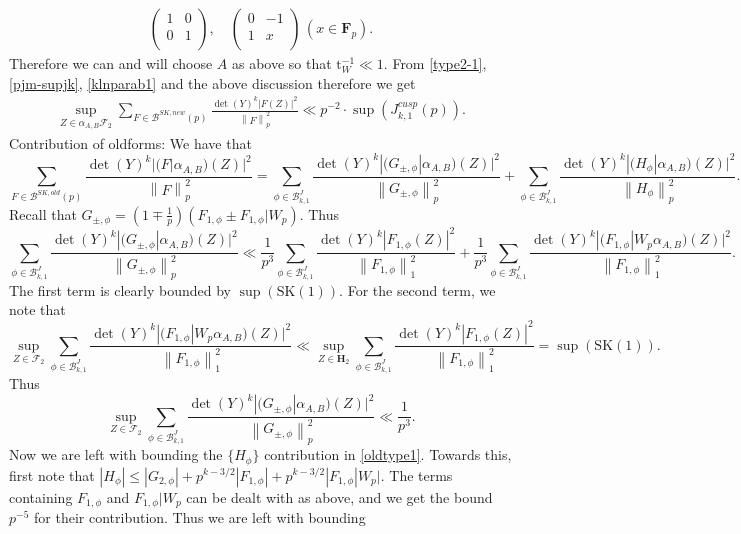 \documentclass[11pt]{amsart}
\makeatletter
\numberwithin{equation}{section}
\renewcommand\subsubsection{\@secnumfont}{\bfseries}%
\renewcommand\subsubsection{\@startsection{subsubsection}{3}
  \z@{.5\linespacing\@plus.7\linespacing}{-.5em}%
  {\normalfont\bfseries}}
\theoremstyle{plain}
\theoremstyle{definition}
\newcommand{\mf}{\mathbf}
\newcommand{\mc}{\mathcal}
\newcommand{\mrm}{\mathrm}
\newcommand*{\norm}[1]{\left\lVert#1\right\rVert}
\newcommand{\q}{\quad}
\newcommand{\pmat}[4]{\begin{pmatrix} #1 & #2 \\ #3 & #4 \\ \end{pmatrix} }
\newcommand{\pfp}{\mf F_p}
\newcommand{\jkp}{J_{k,1}^{cusp}(p)}
\newcommand{\tw}{{\mrm t}_W}
\makeatother
\begin{document}
\begin{align}
    \pmat{1}{0}{0}{1}, \q \pmat{0}{-1}{1}{x} \, (x \in \pfp).
\end{align}
Therefore we can and will choose $A$ as above so that $\tw^{-1} \ll 1$. From \eqref{type2-1}, \eqref{pjm-supjk}, \eqref{klnparab1} and the above discussion therefore we get
\begin{align}
    \sup_{ Z \in {\alpha_{A,B} \mc F_2} } \sum_{F \in \mc B^{SK,new}(p)} \frac{\det(Y)^{k} |F(Z)|^2}{\norm{F}^2_p} \ll p^{-2} \cdot  \sup(\jkp).
\end{align}
\subsubsection{Contribution of oldforms:}\label{old-cont-1} We have that
\begin{equation}\label{oldtype1}
    \sum_{F\in \mc B^{SK, old}(p)}\frac{\det(Y)^k|(F|\alpha_{A,B})(Z)|^2}{\norm{F}^2_p}= \sum_{\phi\in \mc B_{k,1}^J}\frac{\det(Y)^k |(G_{\pm, \phi}|\alpha_{A,B})(Z)|^2}{\norm{G_{\pm, \phi}}^2_p}+\sum_{\phi\in \mc B_{k,1}^J}\frac{\det(Y)^k |(H_{\phi}|\alpha_{A,B})(Z)|^2}{\norm{H_{\phi}}^2_p}.
\end{equation}
Recall that $G_{\pm, \phi}= (1\mp \frac{1}{p})(F_{1,\phi} \pm F_{1,\phi}|W_p)$. Thus
\begin{equation}
    \sum_{\phi\in \mc B_{k,1}^J}\frac{\det(Y)^k |(G_{\pm, \phi}|\alpha_{A,B})(Z)|^2}{\norm{G_{\pm, \phi}}^2_p}\ll \frac{1}{p^3}\sum_{\phi\in \mc B_{k,1}^J} \frac{\det(Y)^k|F_{1,\phi}(Z)|^2}{\norm{F_{1,\phi}}^2_1}+ \frac{1}{p^3}\sum_{\phi\in \mc B_{k,1}^J} \frac{\det(Y)^k|(F_{1,\phi}|W_p\alpha_{A,B})(Z)|^2}{\norm{F_{1,\phi}}^2_1}.
\end{equation}
The first term is clearly bounded by $\sup(\mrm{SK}(1))$. For the second term, we note that
\begin{equation}
    \sup_{Z\in\mc F_2} \sum_{\phi\in \mc B_{k,1}^J} \frac{\det(Y)^k|(F_{1,\phi}|W_p\alpha_{A,B})(Z)|^2}{\norm{F_{1,\phi}}^2_1}\ll \sup_{Z\in \mf H_2} \sum_{\phi\in \mc B_{k,1}^J} \frac{\det(Y)^k|F_{1,\phi}(Z)|^2}{\norm{F_{1,\phi}}^2_1}= \sup(\mrm{SK}(1)).
\end{equation}
Thus 
\begin{equation} \label{g+-bd}
    \sup_{Z\in\mc F_2}\sum_{\phi\in \mc B_{k,1}^J}\frac{\det(Y)^k |(G_{\pm, \phi}|\alpha_{A,B})(Z)|^2}{\norm{G_{\pm, \phi}}^2_p}\ll \frac{1}{p^3}.
\end{equation}
Now we are left with bounding the $\{H_\phi\}$ contribution in \eqref{oldtype1}. Towards this, first note that $|H_\phi|\le |G_{2,\phi}|+p^{k-3/2}|F_{1,\phi}|+p^{k-3/2}|F_{1,\phi}|W_p|$. The terms containing $F_{1,\phi}$ and $F_{1,\phi}|W_p$ can be dealt with as above, and we get the bound $p^{-5}$ for their contribution. Thus we are left with bounding
\end{document}
